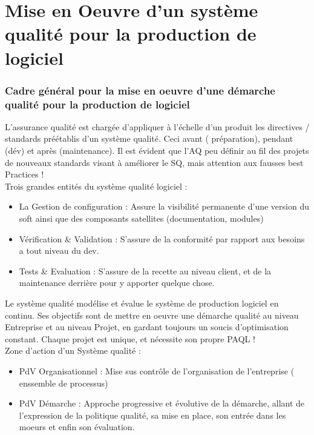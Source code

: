 \part{Mise en Oeuvre d’un système qualité pour la production de logiciel} 

\section{Cadre général pour la mise en oeuvre d’une démarche qualité pour la production de logiciel}


L’assurance qualité est chargée d’appliquer à l’échelle d’un produit les directives / standards préétablis d’un système qualité. Ceci avant ( préparation), pendant (dév) et après (maintenance).
Il est évident que l’AQ peu définir au fil des projets de nouveaux standards visant à améliorer le SQ, mais attention aux fausses best Practices ! \\

Trois grandes entités du système qualité logiciel :\\
\begin{itemize}
\item La Gestion de configuration : Assure la visibilité permanente d’une version du soft ainsi que des composants satellites (documentation, modules)
\item Vérification & Validation  : S’assure de la conformité par rapport aux besoins a tout niveau du dev.
\item Tests \& Evaluation :  S’assure de la recette au niveau client, et de la maintenance derrière pour y apporter quelque chose.
\end{itemize}


Le système qualité modélise et évalue  le système de production logiciel en continu. 
Ses objectifs sont de mettre en oeuvre une démarche qualité au niveau Entreprise et au niveau Projet, en gardant toujours un soucis d’optimisation constant.
Chaque projet est unique, et nécessite son propre PAQL !\\

Zone d’action d’un Système qualité :
\begin{itemize}
\item PdV Organisationnel : Mise sus contrôle de l’organisation de l’entreprise ( enssemble de processus) 
\item PdV Démarche : Approche progressive et évolutive de la démarche, allant de l’expression de la politique qualité, sa mise en place, son entrée dans les moeurs et enfin son évaluation.
\end{itemize}


